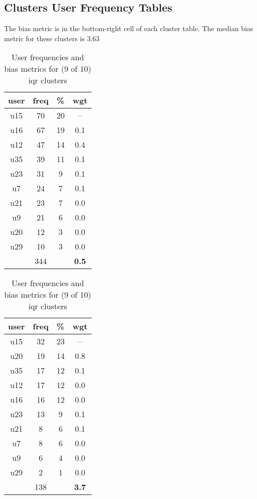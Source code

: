 
\begin{appendices}
\chapter{Clusters User Frequency Tables}\label{ch:clusers-user-frequency-tables}

\begin{table}
\centering
\caption{User frequencies and bias metrics for (9 of 10) iqr clusters}
{\small The bias metric is in the bottom-right cell of each cluster table. The median bias metric for these clusters is 3.63 \\}
\bigskip
\begin{tabular}{ |c|c|c|c| }
	\hline
	\textbf{user} & \textbf{freq} & \textbf{\%} & \textbf{wgt} \\
	\hline
	u15 & 70 & 20 & -- \\
	u16 & 67 & 19 & 0.1 \\
	u12 & 47 & 14 & 0.4 \\
	u35 & 39 & 11 & 0.1 \\
	u23 & 31 & 9 & 0.1 \\
	u7 & 24 & 7 & 0.1 \\
	u21 & 23 & 7 & 0.0 \\
	u9 & 21 & 6 & 0.0 \\
	u20 & 12 & 3 & 0.0 \\
	u29 & 10 & 3 & 0.0 \\
	 & 344 & & \textbf{0.5} \\
	\hline
\end{tabular}
\begin{tabular}{ |c|c|c|c| }
	\hline
	\textbf{user} & \textbf{freq} & \textbf{\%} & \textbf{wgt} \\
	\hline
	u15 & 32 & 23 & -- \\
	u20 & 19 & 14 & 0.8 \\
	u35 & 17 & 12 & 0.1 \\
	u12 & 17 & 12 & 0.0 \\
	u16 & 16 & 12 & 0.0 \\
	u23 & 13 & 9 & 0.1 \\
	u21 & 8 & 6 & 0.1 \\
	u7 & 8 & 6 & 0.0 \\
	u9 & 6 & 4 & 0.0 \\
	u29 & 2 & 1 & 0.0 \\
	 & 138 & & \textbf{3.7} \\
	\hline
\end{tabular}

\end{table}
\end{appendices}
